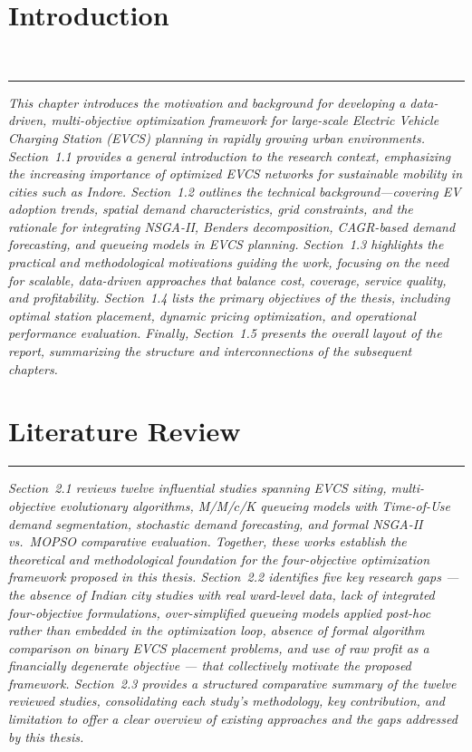 \documentclass[12pt,phd,times]{pkmthesis}
\begin{document}
\chapter{Introduction}\\
\vspace{-1cm}

\noindent \rule{6.6in}{0.01in}
\emph{\emph{
This chapter introduces the motivation and background for developing a data-driven,
multi-objective optimization framework for large-scale Electric Vehicle Charging Station
(EVCS) planning in rapidly growing urban environments. Section~1.1 provides a general
introduction to the research context, emphasizing the increasing importance of optimized
EVCS networks for sustainable mobility in cities such as Indore. Section~1.2 outlines the
technical background—covering EV adoption trends, spatial demand characteristics,
grid constraints, and the rationale for integrating NSGA-II, Benders decomposition,
CAGR-based demand forecasting, and queueing models in EVCS planning. Section~1.3
highlights the practical and methodological motivations guiding the work, focusing on the
need for scalable, data-driven approaches that balance cost, coverage, service quality,
and profitability. Section~1.4 lists the primary objectives of the thesis, including optimal
station placement, dynamic pricing optimization, and operational performance evaluation.
Finally, Section~1.5 presents the overall layout of the report, summarizing the structure
and interconnections of the subsequent chapters.
}
}

\label{chap:intro}

\chapter{Literature Review}
\vspace{-1cm}
\noindent \rule{6.6in}{0.01in}
\emph{\emph{
Section~2.1 reviews twelve influential studies spanning EVCS siting,
multi-objective evolutionary algorithms, M/M/$c$/K queueing models
with Time-of-Use demand segmentation, stochastic demand forecasting,
and formal NSGA-II vs.\ MOPSO comparative evaluation. Together,
these works establish the theoretical and methodological foundation
for the four-objective optimization framework proposed in this thesis.
Section~2.2 identifies five key research gaps --- the absence of
Indian city studies with real ward-level data, lack of integrated
four-objective formulations, over-simplified queueing models applied
post-hoc rather than embedded in the optimization loop, absence of
formal algorithm comparison on binary EVCS placement problems, and
use of raw profit as a financially degenerate objective --- that
collectively motivate the proposed framework.
Section~2.3 provides a structured comparative summary of the twelve
reviewed studies, consolidating each study's methodology, key
contribution, and limitation to offer a clear overview of existing
approaches and the gaps addressed by this thesis.
}}
\end{document}
